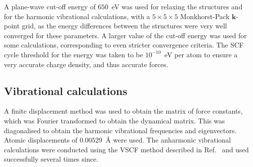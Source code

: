 \documentclass[aps,showpacs,prb,reprint,superscriptaddress,longbibliography]{revtex4-1}
\begin{document}
A plane-wave cut-off energy of $650$~eV was used for relaxing the
structures and for the harmonic vibrational calculations, with a
$5\times5\times5$ Monkhorst-Pack $\mathbf{k}$-point
grid\cite{monkhorst_special_1976}, as the energy differences between
the structures were very well converged for these parameters. A larger
value of the cut-off energy was used for some calculations,
corresponding to even stricter convergence criteria. The SCF cycle
threshold for the energy was taken to be $10^{-10}$~eV per atom to
ensure a very accurate charge density, and thus accurate forces.

\subsection{Vibrational calculations}

A finite displacement method was used to obtain the matrix of force
constants, which was Fourier transformed to obtain the dynamical
matrix.\cite{kunc_ab_1982} This was diagonalised to obtain the
harmonic vibrational frequencies and eigenvectors.  Atomic
displacements of $0.00529$~\r{A} were used.  The anharmonic
vibrational calculations were conducted using the VSCF method
described in Ref.~ and used
successfully several times
since.\cite{azadi_dissociation_2014,monserrat_electron-phonon_2014,engel_anharmonic_2015}
\end{document}
